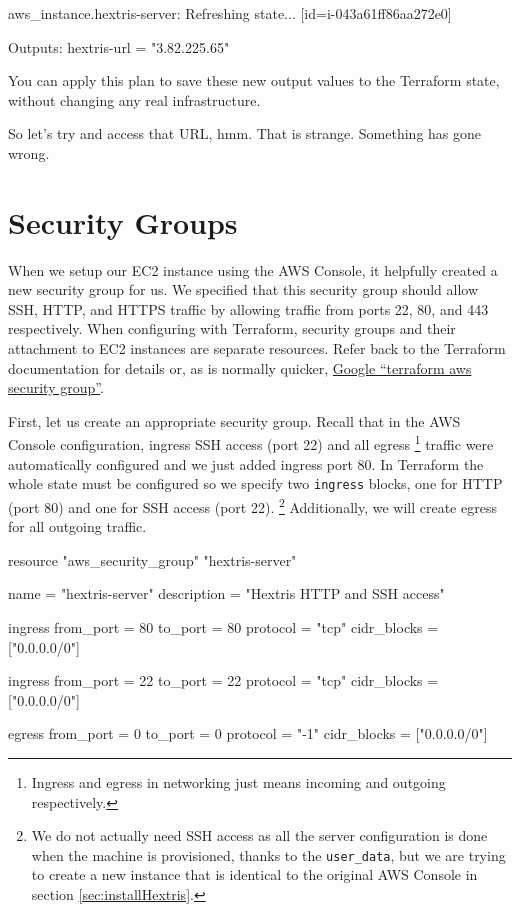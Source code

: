 \documentclass{csse4400}
\begin{document}
\begin{code}[numbers=none]{}
aws_instance.hextris-server: Refreshing state... [id=i-043a61ff86aa272e0]

Outputs:
hextris-url = "3.82.225.65"
\end{code}

You can apply this plan to save these new output values to the Terraform state, without changing any real infrastructure.  

So let's try and access that URL, hmm.
That is strange. Something has gone wrong.


\section{Security Groups}
When we setup our EC2 instance using the AWS Console,
it helpfully created a new security group for us.
We specified that this security group should allow SSH, HTTP, and HTTPS traffic by allowing traffic from ports 22, 80, and 443 respectively.
When configuring with Terraform, security groups and their attachment to EC2 instances are separate resources.
Refer back to the Terraform documentation for details or,
as is normally quicker, \href{https://www.google.com/search?q=terraform+aws+security+group}{Google ``terraform aws security group''}.

First, let us create an appropriate security group.
Recall that in the AWS Console configuration,
ingress SSH access (port 22) and all egress%
\footnote{Ingress and egress in networking just means incoming and outgoing respectively.}
traffic were automatically configured and we just added ingress port 80.
In Terraform the whole state must be configured so we specify two \texttt{ingress} blocks,
one for HTTP (port 80) and one for SSH access (port 22).%
\footnote{We do not actually need SSH access as all the server configuration is done when the machine is provisioned, thanks to the \texttt{user\_data},
but we are trying to create a new instance that is identical to the original AWS Console in section \ref{sec:installHextris}.}
Additionally, we will create egress for all outgoing traffic.

\begin{code}[language=terraform,numbers=none]{}
resource "aws_security_group" "hextris-server" {
  name = "hextris-server"
  description = "Hextris HTTP and SSH access"

  ingress {
    from_port = 80
    to_port = 80
    protocol = "tcp"
    cidr_blocks = ["0.0.0.0/0"]
  }

  ingress {
    from_port = 22
    to_port = 22
    protocol = "tcp"
    cidr_blocks = ["0.0.0.0/0"]
  }

  egress {
    from_port = 0
    to_port = 0
    protocol = "-1"
    cidr_blocks = ["0.0.0.0/0"]
  }
}
\end{code}
\end{document}
